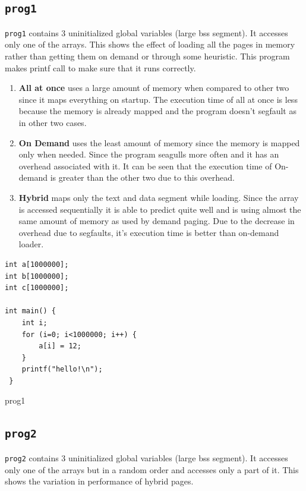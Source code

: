 \documentclass[10pt] {article}
\begin{document}
\subsection{\texttt{prog1}}
\texttt{prog1} contains 3 uninitialized global variables (large bss segment). It accesses only one of the arrays. This shows the effect of loading all the pages in memory rather than getting them on demand or through some heuristic. This program makes printf call to make sure that it runs correctly.
\begin{enumerate}
\item \textbf{All at once} uses a large amount of memory when compared to other two since it maps everything on startup. The execution time of all at once is less because the memory is already mapped and the program doesn't segfault as in other two cases.
\item \textbf{On Demand} uses the least amount of memory since the memory is mapped only when needed. Since the program seagulls more often and it has an overhead associated with it. It can be seen that the execution time of On-demand is greater than the other two due to this overhead.
\item \textbf{Hybrid} maps only the text and data segment while loading. Since the array is accessed sequentially it is able to predict quite well and is using almost the same amount of memory as used by demand paging. Due to the decrease in overhead due to segfaults, it's execution time is better than on-demand loader. 
\end{enumerate}

\begin{listing}[ht!]
\begin{verbatim}
int a[1000000];
int b[1000000];
int c[1000000];

int main() {
	int i;
	for (i=0; i<1000000; i++) {
		a[i] = 12;
	}
	printf("hello!\n");
 }
\end{verbatim}
\label{lst:sched}
\caption{prog1}
\end{listing}


\subsection{\texttt{prog2}}
\texttt{prog2} contains 3 uninitialized global variables (large bss segment). It accesses only one of the arrays but in a random order and accesses only a part of it. This shows the variation in performance of hybrid pages.
\end{document}
